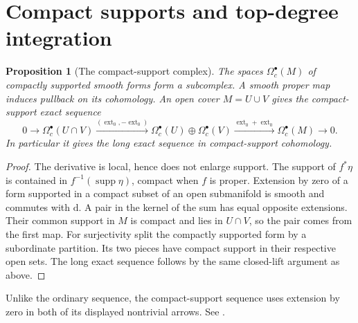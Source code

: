 \documentclass[11pt,oneside,openany]{book}
\newtheorem{proposition}[theorem]{Proposition}
\theoremstyle{definition}
\theoremstyle{remark}
\newcommand{\dd}{\mathrm d}
\DeclareMathOperator{\supp}{supp}
\begin{document}
\section{Compact supports and top-degree integration}

\begin{proposition}[The compact-support complex]
\label{p104:M11.05}
The spaces \(\Omega_c^\bullet(M)\) of compactly supported smooth
forms form a subcomplex. A smooth proper map induces pullback
on its cohomology. An open cover \(M=U\cup V\) gives the
compact-support exact sequence
\[
 0\longrightarrow\Omega_c^\bullet(U\cap V)
 \xrightarrow{(\operatorname{ext}_0,-\operatorname{ext}_0)}
 \Omega_c^\bullet(U)\oplus\Omega_c^\bullet(V)
 \xrightarrow{\operatorname{ext}_0+\operatorname{ext}_0}
 \Omega_c^\bullet(M)\longrightarrow0 .
\]
In particular it gives the long exact sequence in compact-support
cohomology.
\end{proposition}
\begin{proof}
The derivative is local, hence does not enlarge support.
The support of \(f^*\eta\) is contained in \(f^{-1}(\supp\eta)\),
compact when \(f\) is proper. Extension by zero of a form
supported in a compact subset of an open submanifold is smooth
and commutes with \(\dd\). A pair in the kernel of the sum has
equal opposite extensions. Their common support in \(M\) is
compact and lies in \(U\cap V\), so the pair comes from the
first map. For surjectivity split the compactly supported
form by a subordinate partition. Its two pieces have compact
support in their respective open sets. The long exact
sequence follows by the same closed-lift argument as above.
\end{proof}
Unlike the ordinary sequence, the compact-support sequence
uses extension by zero in both of its displayed nontrivial
arrows. See \cite[pp.~451--455]{lee}.
\end{document}
